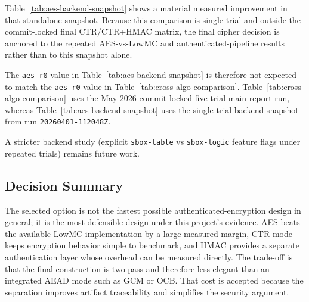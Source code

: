 Table~\ref{tab:aes-backend-snapshot} shows a material measured improvement in
that standalone snapshot. Because this comparison is single-trial and outside the
commit-locked final CTR/CTR+HMAC matrix, the final cipher decision is anchored to
the repeated AES-vs-LowMC and authenticated-pipeline results rather than to this
snapshot alone.

The \texttt{aes-r0} value in Table~\ref{tab:aes-backend-snapshot} is therefore
not expected to match the \texttt{aes-r0} value in
Table~\ref{tab:cross-algo-comparison}. Table~\ref{tab:cross-algo-comparison}
uses the May 2026 commit-locked five-trial main report run, whereas
Table~\ref{tab:aes-backend-snapshot} uses the single-trial backend snapshot from
run \texttt{20260401-112048Z}.

A stricter backend study (explicit \texttt{sbox-table} vs \texttt{sbox-logic}
feature flags under repeated trials) remains future work.

\subsection{Decision Summary}

The selected option is not the fastest possible authenticated-encryption design
in general; it is the most defensible design under this project's evidence. AES
beats the available LowMC implementation by a large measured margin, CTR mode
keeps encryption behavior simple to benchmark, and HMAC provides a separate
authentication layer whose overhead can be measured directly. The trade-off is
that the final construction is two-pass and therefore less elegant than an
integrated AEAD mode such as GCM or OCB. That cost is accepted because the
separation improves artifact traceability and simplifies the security argument.
